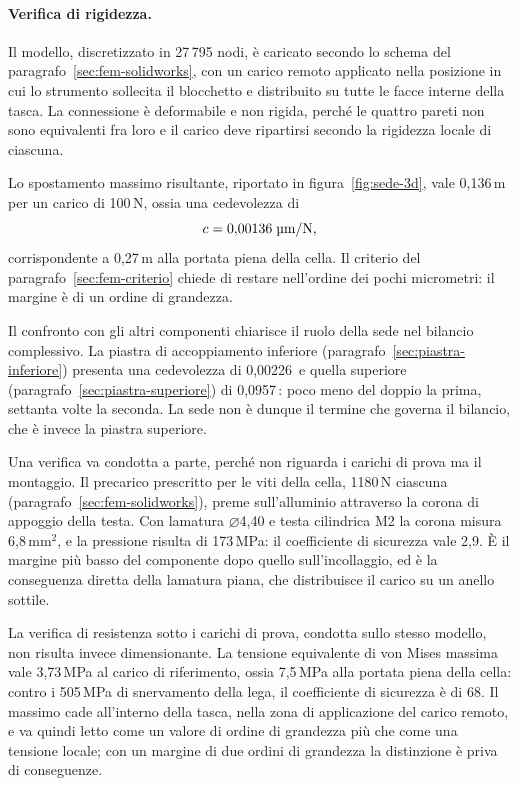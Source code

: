 \paragraph{Verifica di rigidezza.}
Il modello, discretizzato in 27\,795 nodi, è caricato secondo lo schema del
paragrafo~\ref{sec:fem-solidworks},
con un carico remoto applicato nella posizione in cui lo strumento sollecita il
blocchetto e distribuito su tutte le facce interne della tasca. La connessione è
deformabile e non rigida, perché le quattro pareti non sono equivalenti fra loro
e il carico deve ripartirsi secondo la rigidezza locale di ciascuna.

Lo spostamento massimo risultante, riportato in
figura~\ref{fig:sede-3d}, vale 0,136\,\textmu m per un carico di 100\,N, ossia
una cedevolezza di
\begin{equation}
    c = 0{,}00136 \; \text{\textmu m/N} ,
\end{equation}
corrispondente a 0,27\,\textmu m alla portata piena della cella. Il criterio del
paragrafo~\ref{sec:fem-criterio} chiede di restare nell'ordine dei pochi
micrometri: il margine è di un ordine di grandezza.

Il confronto con gli altri componenti chiarisce il ruolo della sede nel bilancio
complessivo. La piastra di accoppiamento inferiore
(paragrafo~\ref{sec:piastra-inferiore}) presenta una cedevolezza di
0,00226\, e quella superiore
(paragrafo~\ref{sec:piastra-superiore}) di 0,0957\,: poco meno
del doppio la prima, settanta volte la seconda. La sede non è dunque il termine
che governa il bilancio, che è invece la piastra superiore.

Una verifica va condotta a parte, perché non riguarda i carichi di prova ma il
montaggio. Il precarico prescritto per le viti della cella, 1180\,N ciascuna
(paragrafo~\ref{sec:fem-solidworks}), preme sull'alluminio attraverso la corona
di appoggio della testa. Con lamatura $\varnothing$4,40 e testa cilindrica M2 la
corona misura 6,8\,mm$^2$, e la pressione risulta di 173\,MPa: il coefficiente
di sicurezza vale 2,9. È il margine più basso del componente dopo quello
sull'incollaggio, ed è la conseguenza diretta della lamatura piana, che
distribuisce il carico su un anello sottile.

La verifica di resistenza sotto i carichi di prova, condotta sullo stesso
modello, non risulta invece dimensionante. La tensione equivalente di von Mises massima vale 3,73\,MPa al
carico di riferimento, ossia 7,5\,MPa alla portata piena della cella: contro i
505\,MPa di snervamento della lega, il coefficiente di sicurezza è di 68. Il
massimo cade all'interno della tasca, nella zona di applicazione del carico
remoto, e va quindi letto come un valore di ordine di grandezza più che come una
tensione locale; con un margine di due ordini di grandezza la distinzione è
priva di conseguenze.

